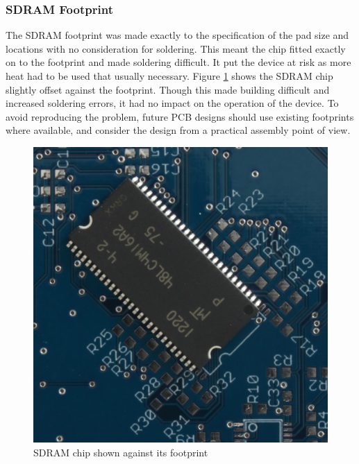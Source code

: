 \subsubsection{SDRAM Footprint}
The SDRAM footprint was made exactly to the specification of the pad size and locations with no consideration for soldering. This meant the chip fitted exactly on to the footprint and made soldering difficult. %
It put the device at risk as more heat had to be used that usually necessary. Figure \ref{fig:SDRAM_Err} shows the SDRAM chip slightly offset against the footprint. 
Though this made building difficult and increased soldering errors, it had no impact on the operation of the device. To avoid reproducing the problem, future PCB designs should use existing footprints where available, and consider the design from a practical assembly point of view.

\begin{figure}
\centering
\includegraphics[width=\textwidth / 2]{./Figures/PCB_SDRAM.jpg}
\caption{SDRAM chip shown against its footprint}
\label{fig:SDRAM_Err}
\end{figure}


